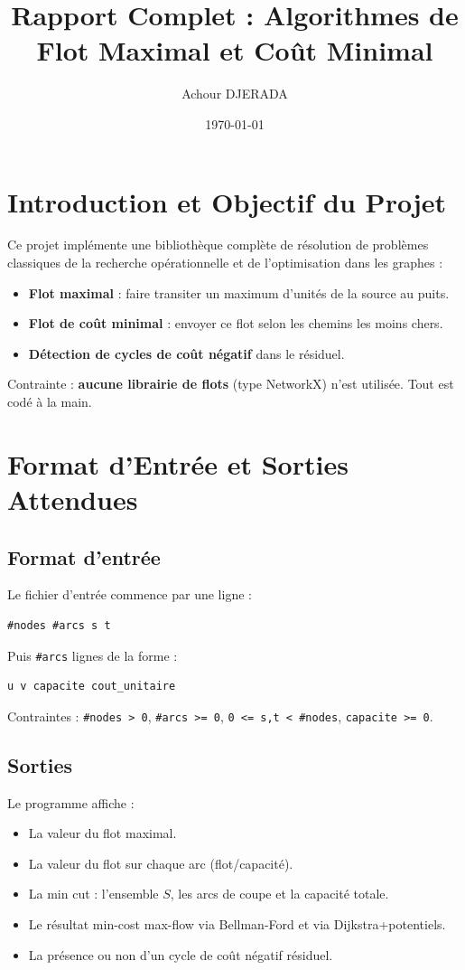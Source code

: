 \documentclass[11pt,a4paper]{article}
\title{Rapport Complet : Algorithmes de Flot Maximal et Co\^ut Minimal}
\author{Achour DJERADA}
\date{\today}
\begin{document}
\maketitle

\section{Introduction et Objectif du Projet}
Ce projet impl\'emente une biblioth\`eque compl\`ete de r\'esolution de probl\`emes classiques de la recherche op\'erationnelle et de l'optimisation dans les graphes :
\begin{itemize}
    \item \textbf{Flot maximal} : faire transiter un maximum d'unit\'es de la source au puits.
    \item \textbf{Flot de co\^ut minimal} : envoyer ce flot selon les chemins les moins chers.
    \item \textbf{D\'etection de cycles de co\^ut n\'egatif} dans le r\'esiduel.
\end{itemize}
Contrainte : \textbf{aucune librairie de flots} (type NetworkX) n'est utilis\'ee. Tout est cod\'e \`a la main.

\section{Format d'Entr\'ee et Sorties Attendues}
\subsection{Format d'entr\'ee}
Le fichier d'entr\'ee commence par une ligne :
\begin{verbatim}
#nodes #arcs s t
\end{verbatim}
Puis \texttt{\#arcs} lignes de la forme :
\begin{verbatim}
u v capacite cout_unitaire
\end{verbatim}
Contraintes : \texttt{\#nodes > 0}, \texttt{\#arcs >= 0}, \texttt{0 <= s,t < \#nodes}, \texttt{capacite >= 0}.

\subsection{Sorties}
Le programme affiche :
\begin{itemize}
    \item La valeur du flot maximal.
    \item La valeur du flot sur chaque arc (flot/capacit\'e).
    \item La min cut : l'ensemble $S$, les arcs de coupe et la capacit\'e totale.
    \item Le r\'esultat min-cost max-flow via Bellman-Ford et via Dijkstra+potentiels.
    \item La pr\'esence ou non d'un cycle de co\^ut n\'egatif r\'esiduel.
\end{itemize}
\end{document}
